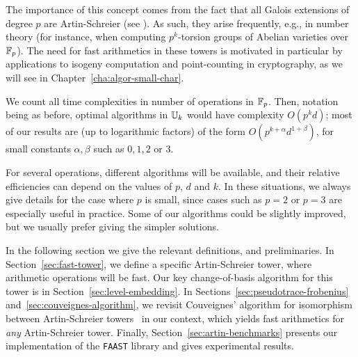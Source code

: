 The importance of this concept comes from the fact that all Galois
extensions of degree $p$ are Artin-Schreier (see \cite[VI,
$\S6$]{lang}). As such, they arise frequently, e.g., in number theory
(for instance, when computing $p^k$-torsion groups of Abelian
varieties over $\mathbb{F}_p$). The need for fast arithmetics in these towers
is motivated in particular by applications to isogeny computation and
point-counting in cryptography, as we will see in
Chapter~\ref{cha:algor-small-char}.

We count all time complexities in number of operations in
$\mathbb{F}_p$. Then, notation being as before, optimal algorithms in $\mathbb{U}_k$
would have complexity $O(p^kd)$; most of our results are (up to
logarithmic factors) of the form $O(p^{k+\alpha} d^{1+\beta})$, for
small constants $\alpha,\beta$ such as $0,1,2$ or $3$.

For several operations, different algorithms will be available, and
their relative efficiencies can depend on the values of $p$, $d$ and
$k$. In these situations, we always give details for the case where
$p$ is small, since cases such as $p=2$ or $p=3$ are especially useful
in practice. Some of our algorithms could be slightly
improved, but we usually prefer giving the simpler solutions.

In the following section we give the relevant definitions, and
preliminaries. In Section~\ref{sec:fast-tower}, we define a specific
Artin-Schreier tower, where arithmetic operations will be fast. Our
key change-of-basis algorithm for this tower is in
Section~\ref{sec:level-embedding}. In
Sections~\ref{sec:pseudotrace-frobenius}
and~\ref{sec:couveignes-algorithm}, we revisit Couveignes' algorithm
for isomorphism between Artin-Schreier towers~\cite{couveignes00} in
our context, which yields fast arithmetics for {\em any}
Artin-Schreier tower. Finally, Section~\ref{sec:artin-benchmarks} presents
our implementation of the \texttt{FAAST} library and gives
experimental results.



%
